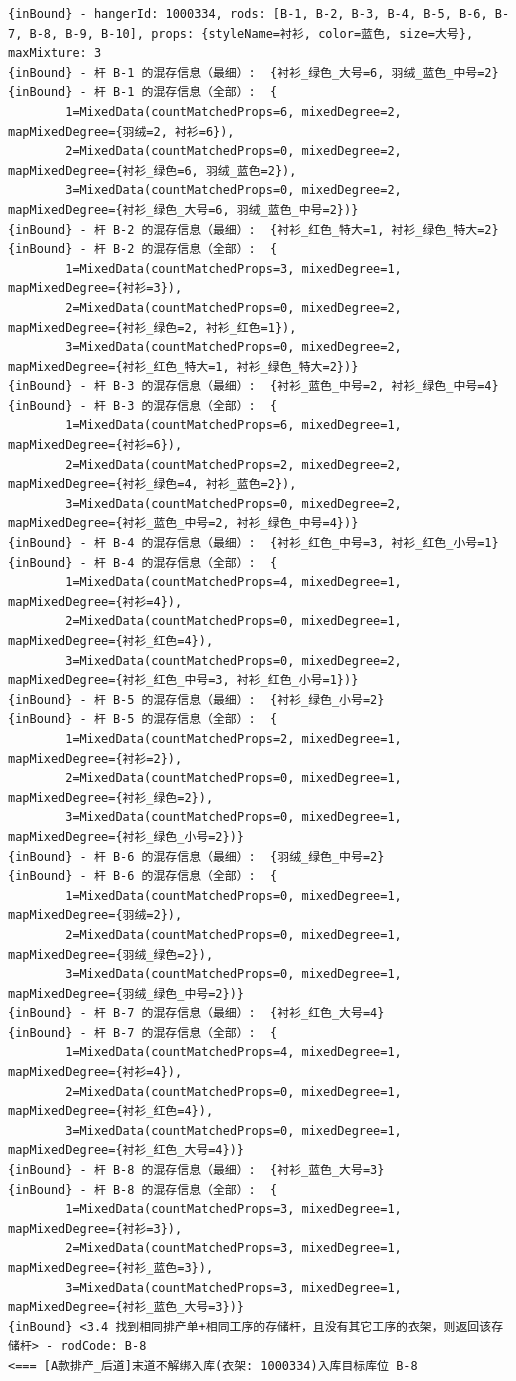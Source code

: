 {\begin{verbatim}
{inBound} - hangerId: 1000334, rods: [B-1, B-2, B-3, B-4, B-5, B-6, B-7, B-8, B-9, B-10], props: {styleName=衬衫, color=蓝色, size=大号}, maxMixture: 3
{inBound} - 杆 B-1 的混存信息（最细）:  {衬衫_绿色_大号=6, 羽绒_蓝色_中号=2}
{inBound} - 杆 B-1 的混存信息（全部）:  {
		1=MixedData(countMatchedProps=6, mixedDegree=2, mapMixedDegree={羽绒=2, 衬衫=6}), 
		2=MixedData(countMatchedProps=0, mixedDegree=2, mapMixedDegree={衬衫_绿色=6, 羽绒_蓝色=2}), 
		3=MixedData(countMatchedProps=0, mixedDegree=2, mapMixedDegree={衬衫_绿色_大号=6, 羽绒_蓝色_中号=2})}
{inBound} - 杆 B-2 的混存信息（最细）:  {衬衫_红色_特大=1, 衬衫_绿色_特大=2}
{inBound} - 杆 B-2 的混存信息（全部）:  {
		1=MixedData(countMatchedProps=3, mixedDegree=1, mapMixedDegree={衬衫=3}), 
		2=MixedData(countMatchedProps=0, mixedDegree=2, mapMixedDegree={衬衫_绿色=2, 衬衫_红色=1}), 
		3=MixedData(countMatchedProps=0, mixedDegree=2, mapMixedDegree={衬衫_红色_特大=1, 衬衫_绿色_特大=2})}
{inBound} - 杆 B-3 的混存信息（最细）:  {衬衫_蓝色_中号=2, 衬衫_绿色_中号=4}
{inBound} - 杆 B-3 的混存信息（全部）:  {
		1=MixedData(countMatchedProps=6, mixedDegree=1, mapMixedDegree={衬衫=6}), 
		2=MixedData(countMatchedProps=2, mixedDegree=2, mapMixedDegree={衬衫_绿色=4, 衬衫_蓝色=2}), 
		3=MixedData(countMatchedProps=0, mixedDegree=2, mapMixedDegree={衬衫_蓝色_中号=2, 衬衫_绿色_中号=4})}
{inBound} - 杆 B-4 的混存信息（最细）:  {衬衫_红色_中号=3, 衬衫_红色_小号=1}
{inBound} - 杆 B-4 的混存信息（全部）:  {
		1=MixedData(countMatchedProps=4, mixedDegree=1, mapMixedDegree={衬衫=4}), 
		2=MixedData(countMatchedProps=0, mixedDegree=1, mapMixedDegree={衬衫_红色=4}), 
		3=MixedData(countMatchedProps=0, mixedDegree=2, mapMixedDegree={衬衫_红色_中号=3, 衬衫_红色_小号=1})}
{inBound} - 杆 B-5 的混存信息（最细）:  {衬衫_绿色_小号=2}
{inBound} - 杆 B-5 的混存信息（全部）:  {
		1=MixedData(countMatchedProps=2, mixedDegree=1, mapMixedDegree={衬衫=2}), 
		2=MixedData(countMatchedProps=0, mixedDegree=1, mapMixedDegree={衬衫_绿色=2}), 
		3=MixedData(countMatchedProps=0, mixedDegree=1, mapMixedDegree={衬衫_绿色_小号=2})}
{inBound} - 杆 B-6 的混存信息（最细）:  {羽绒_绿色_中号=2}
{inBound} - 杆 B-6 的混存信息（全部）:  {
		1=MixedData(countMatchedProps=0, mixedDegree=1, mapMixedDegree={羽绒=2}), 
		2=MixedData(countMatchedProps=0, mixedDegree=1, mapMixedDegree={羽绒_绿色=2}), 
		3=MixedData(countMatchedProps=0, mixedDegree=1, mapMixedDegree={羽绒_绿色_中号=2})}
{inBound} - 杆 B-7 的混存信息（最细）:  {衬衫_红色_大号=4}
{inBound} - 杆 B-7 的混存信息（全部）:  {
		1=MixedData(countMatchedProps=4, mixedDegree=1, mapMixedDegree={衬衫=4}), 
		2=MixedData(countMatchedProps=0, mixedDegree=1, mapMixedDegree={衬衫_红色=4}), 
		3=MixedData(countMatchedProps=0, mixedDegree=1, mapMixedDegree={衬衫_红色_大号=4})}
{inBound} - 杆 B-8 的混存信息（最细）:  {衬衫_蓝色_大号=3}
{inBound} - 杆 B-8 的混存信息（全部）:  {
		1=MixedData(countMatchedProps=3, mixedDegree=1, mapMixedDegree={衬衫=3}), 
		2=MixedData(countMatchedProps=3, mixedDegree=1, mapMixedDegree={衬衫_蓝色=3}), 
		3=MixedData(countMatchedProps=3, mixedDegree=1, mapMixedDegree={衬衫_蓝色_大号=3})}
{inBound} <3.4 找到相同排产单+相同工序的存储杆，且没有其它工序的衣架，则返回该存储杆> - rodCode: B-8
<=== [A款排产_后道]末道不解绑入库(衣架: 1000334)入库目标库位 B-8


\end{verbatim}}

